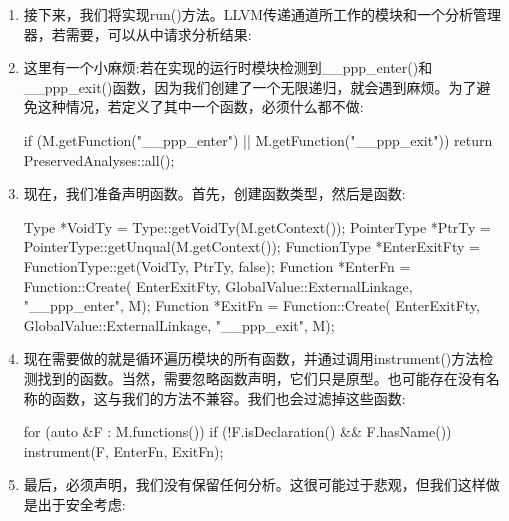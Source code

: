 \begin{enumerate}
\item
接下来，我们将实现run()方法。LLVM传递通道所工作的模块和一个分析管理器，若需要，可以从中请求分析结果:

\begin{cpp}
PreservedAnalyses
PPProfilerIRPass::run(Module &M,
                      ModuleAnalysisManager &AM) {
\end{cpp}

\item
这里有一个小麻烦:若在实现的运行时模块检测到\_\_ppp\_enter()和\_\_ppp\_exit()函数，因为我们创建了一个无限递归，就会遇到麻烦。为了避免这种情况，若定义了其中一个函数，必须什么都不做:

\begin{cpp}
    if (M.getFunction("__ppp_enter") ||
        M.getFunction("__ppp_exit")) {
            return PreservedAnalyses::all();
    }
\end{cpp}

\item
现在，我们准备声明函数。首先，创建函数类型，然后是函数:

\begin{cpp}
    Type *VoidTy = Type::getVoidTy(M.getContext());
    PointerType *PtrTy =
        PointerType::getUnqual(M.getContext());
    FunctionType *EnterExitFty =
        FunctionType::get(VoidTy, {PtrTy}, false);
    Function *EnterFn = Function::Create(
        EnterExitFty, GlobalValue::ExternalLinkage,
        "__ppp_enter", M);
    Function *ExitFn = Function::Create(
        EnterExitFty, GlobalValue::ExternalLinkage,
        "__ppp_exit", M);
\end{cpp}

\item
现在需要做的就是循环遍历模块的所有函数，并通过调用instrument()方法检测找到的函数。当然，需要忽略函数声明，它们只是原型。也可能存在没有名称的函数，这与我们的方法不兼容。我们也会过滤掉这些函数:

\begin{cpp}
    for (auto &F : M.functions()) {
        if (!F.isDeclaration() && F.hasName())
            instrument(F, EnterFn, ExitFn);
    }
\end{cpp}

\item
最后，必须声明，我们没有保留任何分析。这很可能过于悲观，但我们这样做是出于安全考虑:

\begin{cpp}
    return PreservedAnalyses::none();
}
\end{cpp}


\end{enumerate}
